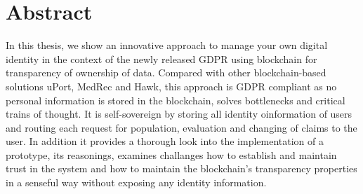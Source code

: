 \chapter*{Abstract}
\label{cha:abstract}

In this thesis, we show an innovative approach to manage your own digital identity in the context
of the newly released GDPR using blockchain for transparency of ownership of data.
Compared with other blockchain-based solutions uPort, MedRec and Hawk,
this approach is GDPR compliant as no personal information is stored in the blockchain, solves bottlenecks and critical
trains of thought.
It is self-sovereign by storing all identity oinformation of users and routing each request for population, evaluation and
changing of claims to the user.
In addition it provides a thorough look into the implementation of a prototype, its reasonings, examines challanges
how to establish and maintain trust in the system and how to maintain the blockchain's transparency properties in a
senseful way without exposing any identity information.


